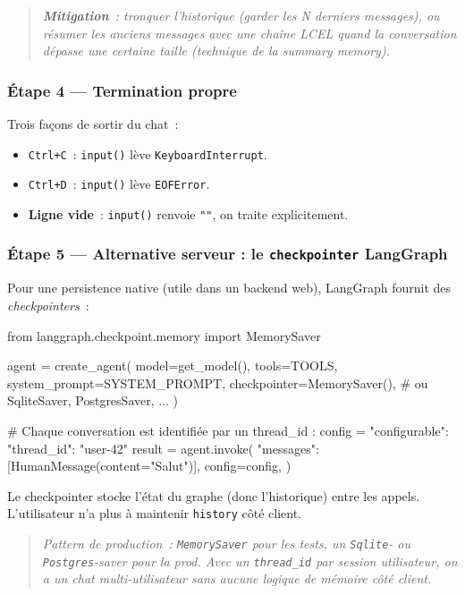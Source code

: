 \documentclass[11pt,a4paper]{article}
\begin{document}
\begin{quote}\itshape
\textbf{Mitigation}~: tronquer l'historique (garder les N derniers
messages), ou \emph{résumer} les anciens messages avec une chaîne LCEL
quand la conversation dépasse une certaine taille (technique de la
\emph{summary memory}).
\end{quote}

\subsubsection*{Étape 4 — Termination propre}

Trois façons de sortir du chat~:

\begin{itemize}[leftmargin=*]
  \item \texttt{Ctrl+C}~: \texttt{input()} lève \texttt{KeyboardInterrupt}.
  \item \texttt{Ctrl+D}~: \texttt{input()} lève \texttt{EOFError}.
  \item \textbf{Ligne vide}~: \texttt{input()} renvoie \texttt{""}, on
        traite explicitement.
\end{itemize}

\subsubsection*{Étape 5 — Alternative serveur : le \texttt{checkpointer} LangGraph}

Pour une persistence native (utile dans un backend web), LangGraph
fournit des \emph{checkpointers}~:

\begin{pythoncode}
from langgraph.checkpoint.memory import MemorySaver

agent = create_agent(
    model=get_model(),
    tools=TOOLS,
    system_prompt=SYSTEM_PROMPT,
    checkpointer=MemorySaver(),   # ou SqliteSaver, PostgresSaver, ...
)

# Chaque conversation est identifiée par un thread_id :
config = {"configurable": {"thread_id": "user-42"}}
result = agent.invoke(
    {"messages": [HumanMessage(content="Salut")]},
    config=config,
)
\end{pythoncode}

Le checkpointer stocke l'état du graphe (donc l'historique) entre les
appels. L'utilisateur n'a plus à maintenir \texttt{history} côté client.

\begin{quote}\itshape
Pattern de production~: \texttt{MemorySaver} pour les tests, un
\texttt{Sqlite}- ou \texttt{Postgres}-saver pour la prod. Avec un
\texttt{thread\_id} par session utilisateur, on a un chat multi-utilisateur
sans aucune logique de mémoire côté client.
\end{quote}
\end{document}
